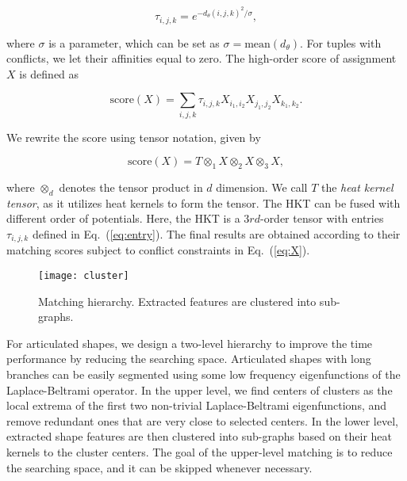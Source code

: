 \begin{equation}
\label{eq:entry}
\tau_{i,j,k}=e^{-d_{\theta}(i,j,k)^{2}/\sigma},
\end{equation}

where $\sigma$ is a parameter, which can be set as $\sigma=\mathrm{mean} (d_{\theta})$. For tuples with conflicts, we let their affinities equal to zero. The high-order score of assignment $X$ is defined as

\begin{equation}
\mbox{score}(X)=\sum_{i,j,k} \tau_{i,j,k} X_{i_{1},i_{2}} X_{j_{1},j_{2}} X_{k_{1},k_{2}}.
\end{equation}

We rewrite the score using tensor notation, given by

\begin{equation}\label{eq:tensor}
\mbox{score}(X)=T\otimes_{1}X\otimes_{2}X\otimes_{3}X,
\end{equation}

where $\otimes_{d}$ denotes the tensor product in $d$ dimension. We call $T$ the \emph{heat kernel tensor}, as it utilizes heat kernels to form the tensor. The HKT can be fused with different order of potentials. Here, the HKT is a $3rd$-order tensor with entries $\tau_{i,j,k}$ defined in Eq.~(\ref{eq:entry}). The final results are obtained according to their matching scores subject to conflict constraints in Eq.~(\ref{eq:X}).

\begin{figure}
\centering
\texttt{[image: cluster]}\\
\caption[Matching hierarchy.]
{Matching hierarchy. Extracted features are clustered into sub-graphs.}
\label{fig:cluster}
\end{figure}

For articulated shapes, we design a two-level hierarchy to improve the time performance by
reducing the searching space. Articulated shapes with long branches can be easily segmented
using some low frequency eigenfunctions of the Laplace-Beltrami operator. In the upper
level, we find centers of clusters as the local extrema of the first two non-trivial
Laplace-Beltrami eigenfunctions, and remove redundant ones that are very close to selected
centers. In the lower level, extracted shape features are then clustered into sub-graphs
based on their heat kernels to the cluster centers. The goal of the upper-level matching
is to reduce the searching space, and it can be skipped whenever necessary.

